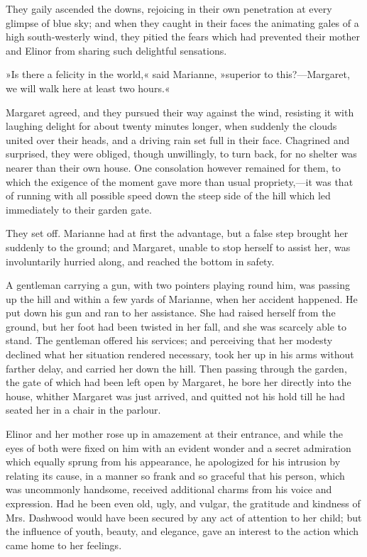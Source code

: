 They gaily ascended the downs, rejoicing in their own penetration at every glimpse of blue sky; and when they caught in their faces the animating gales of a high south-westerly wind, they pitied the fears which had prevented their mother and Elinor from sharing such delightful sensations.

»Is there a felicity in the world,« said Marianne, »superior to this?—Margaret, we will walk here at least two hours.«

Margaret agreed, and they pursued their way against the wind, resisting it with laughing delight for about twenty minutes longer, when suddenly the clouds united over their heads, and a driving rain set full in their face. Chagrined and surprised, they were obliged, though unwillingly, to turn back, for no shelter was nearer than their own house. One consolation however remained for them, to which the exigence of the moment gave more than usual propriety,—it was that of running with all possible speed down the steep side of the hill which led immediately to their garden gate.

They set off. Marianne had at first the advantage, but a false step brought her suddenly to the ground; and Margaret, unable to stop herself to assist her, was involuntarily hurried along, and reached the bottom in safety.

A gentleman carrying a gun, with two pointers playing round him, was passing up the hill and within a few yards of Marianne, when her accident happened. He put down his gun and ran to her assistance. She had raised herself from the ground, but her foot had been twisted in her fall, and she was scarcely able to stand. The gentleman offered his services; and perceiving that her modesty declined what her situation rendered necessary, took her up in his arms without farther delay, and carried her down the hill. Then passing through the garden, the gate of which had been left open by Margaret, he bore her directly into the house, whither Margaret was just arrived, and quitted not his hold till he had seated her in a chair in the parlour.

Elinor and her mother rose up in amazement at their entrance, and while the eyes of both were fixed on him with an evident wonder and a secret admiration which equally sprung from his appearance, he apologized for his intrusion by relating its cause, in a manner so frank and so graceful that his person, which was uncommonly handsome, received additional charms from his voice and expression. Had he been even old, ugly, and vulgar, the gratitude and kindness of Mrs. Dashwood would have been secured by any act of attention to her child; but the influence of youth, beauty, and elegance, gave an interest to the action which came home to her feelings.

